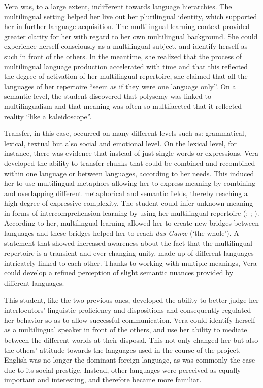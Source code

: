\documentclass[output=paper]{../langscibook}
\begin{document}
Vera was, to a large extent, indifferent towards language hierarchies. The multilingual setting helped her live out her plurilingual identity, which supported her in further language acquisition.  The multilingual learning context provided greater clarity for her with regard to her own multilingual background. She could experience herself consciously as a multilingual subject, and identify herself as such in front of the others. In the meantime, she realized that the process of multilingual language production accelerated with time and that this reflected the degree of activation of her multilingual repertoire, she claimed that all the languages of her repertoire “seem as if they were one language only”. On a semantic level, the student discovered that polysemy was linked to multilingualism and that meaning was often so multifaceted that it reflected reality “like a kaleidoscope”. 

Transfer, in this case, occurred on many different levels such as: grammatical, lexical, textual but also social and emotional level. On the lexical level, for instance, there was evidence that instead of just single words or expressions, Vera developed the ability to transfer chunks that could be combined and recombined within one language or between languages, according to her needs. This induced her to use multilingual metaphors allowing her to express meaning by combining and overlapping different metaphorical and semantic fields, thereby reaching a high degree of expressive complexity. The student could infer unknown meaning in forms of intercomprehension-learning by using her multilingual repertoire (\citealt{HufeisenNeuner2004}; \citealt{MeisnerSchocker2005}; \citealt{MeisnerEtAl2009}). According to her, multilingual learning allowed her to create new bridges between languages and these bridges helped her to reach \emph{das Ganze} (`the whole'). A statement that showed increased awareness about the fact that the multilingual repertoire is a transient and ever-changing unity, made up of different languages intricately linked to each other. Thanks to working with multiple meanings, Vera could develop a refined perception of slight semantic nuances provided by different languages. 

\largerpage
This student, like the two previous ones, developed the ability to better judge her interlocutors’ linguistic proficiency and dispositions and consequently regulated her behavior so as to allow successful communication. Vera could identify herself as a multilingual speaker in front of the others, and use her ability to mediate between the different worlds at their disposal. This not only changed her but also the others’ attitude towards the languages used in the course of the project. English was no longer the dominant foreign language, as was commonly the case due to its social prestige. Instead, other languages were perceived as equally important and interesting, and therefore became more familiar. 
\end{document}
